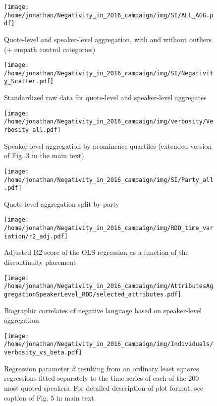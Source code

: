 \begin{figure}[h]\centering
	\texttt{[image: /home/jonathan/Negativity\_in\_2016\_campaign/img/SI/ALL\_AGG.pdf]}
	\caption{Quote-level and speaker-level aggregation, with and without outliers (+ empath control categories)}
	\label{fig: SI_1}
\end{figure}



\begin{figure}[h]\centering
	\texttt{[image: /home/jonathan/Negativity\_in\_2016\_campaign/img/SI/Negativity\_Scatter.pdf]}
	\caption{Standardized raw data for quote-level and speaker-level aggregates}
	\label{fig: SI_2}
\end{figure}



\begin{figure}[h]\centering
	\texttt{[image: /home/jonathan/Negativity\_in\_2016\_campaign/img/verbosity/Verbosity\_all.pdf]}
	\caption{Speaker-level aggregation by prominence quartiles (extended version of Fig. 3 in the main text)}
	\label{fig: SI_3}
\end{figure}



\begin{figure}[h]\centering
	\texttt{[image: /home/jonathan/Negativity\_in\_2016\_campaign/img/SI/Party\_all.pdf]}
	\caption{Quote-level aggregation split by party}
	\label{fig: SI_4}
\end{figure}



\begin{figure}[h]\centering
	\texttt{[image: /home/jonathan/Negativity\_in\_2016\_campaign/img/RDD\_time\_variation/r2\_adj.pdf]}
	\caption{Adjusted R2 score of the OLS regression as a function of the discontinuity placement}
	\label{fig: SI_5}
\end{figure}



\begin{figure}[h]\centering
	\texttt{[image: /home/jonathan/Negativity\_in\_2016\_campaign/img/AttributesAggregationSpeakerLevel\_RDD/selected\_attributes.pdf]}
	\caption{Biographic correlates of negative language based on speaker-level aggregation}
	\label{fig: SI_6}
\end{figure}



\begin{figure}[h]\centering
	\texttt{[image: /home/jonathan/Negativity\_in\_2016\_campaign/img/Individuals/verbosity\_vs\_beta.pdf]}
	\caption{Regression parameter $\beta$ resulting from an ordinary least squares regressions fitted separately to the time series of each of the 200 most quoted speakers. For detailed description of plot format, see caption of Fig. 5 in main text.}
	\label{fig: SI_7}
\end{figure}



